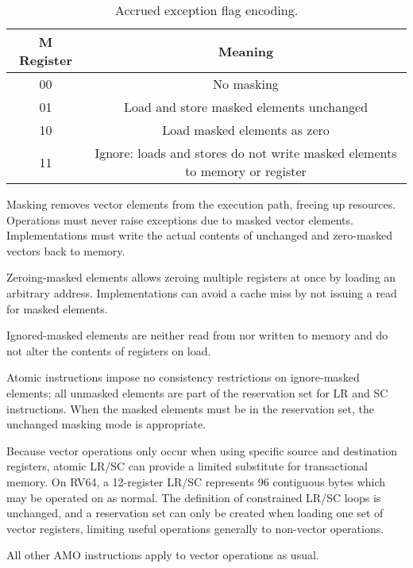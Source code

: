 \begin{table}[htp]
    \begin{small}
        \begin{center}
            \begin{tabular}{cl}
                \hline
                \multicolumn{1}{|c|}{M Register} &
                \multicolumn{1}{c|}{Meaning} \\
                \hline
                \multicolumn{1}{|c|}{00} &
                \multicolumn{1}{c|}{No masking}\\
                \hline
                \multicolumn{1}{|c|}{01} &
                \multicolumn{1}{c|}{Load and store masked elements unchanged}\\
                \hline
                \multicolumn{1}{|c|}{10} &
                \multicolumn{1}{c|}{Load masked elements as zero}\\
                \hline
                \multicolumn{1}{|c|}{11} &
                \multicolumn{1}{c|}{Ignore:  loads and stores do not write masked elements to memory or register}\\
                \hline
            \end{tabular}
        \end{center}
    \end{small}
    \caption{Accrued exception flag encoding.}
    \label{bitdef}
\end{table}

\begin{commentary}
    Masking removes vector elements from the execution path, freeing up resources.
    Operations must never raise exceptions due to masked vector elements.
    Implementations must write the actual contents of unchanged and zero-masked
    vectors back to memory.

    Zeroing-masked elements allows zeroing multiple registers at once by loading an
    arbitrary address.  Implementations can avoid a cache miss by not issuing a read
    for masked elements.

    Ignored-masked elements are neither read from nor written to memory and do not
    alter the contents of registers on load.

    Atomic instructions impose no consistency restrictions on ignore-masked elements;
    all unmasked elements are part of the reservation set for LR and SC instructions.
    When the masked elements must be in the reservation set, the unchanged masking
    mode is appropriate.

    Because vector operations only occur when using specific source and destination
    registers, atomic LR/SC can provide a limited substitute for transactional memory.
    On RV64, a 12-register LR/SC represents 96 contiguous bytes which may be operated
    on as normal.  The definition of constrained LR/SC loops is unchanged, and a
    reservation set can only be created when loading one set of vector registers,
    limiting useful operations generally to non-vector operations.

    All other AMO instructions apply to vector operations as usual.
\end{commentary}

